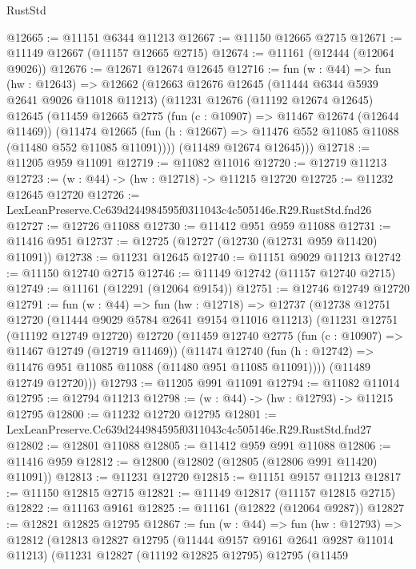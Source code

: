 \begin{lexlean}{RustStd}
\begin{coremodule}
@12665 := @11151 @6344 @11213
@12667 := @11150 @12665 @2715
@12671 := @11149 @12667 (@11157 @12665 @2715)
@12674 := @11161 (@12444 (@12064 @9026))
@12676 := @12671 @12674 @12645
@12716 := fun (w : @44) =>
  fun (hw : @12643) =>
  @12662
    (@12663
      @12676
      @12645
      (@11444 @6344 @5939 @2641 @9026 @11018 @11213)
      (@11231
        @12676
        (@11192 @12674 @12645)
        @12645
        (@11459
          @12665
          @2775
          (fun (c : @10907) => @11467 @12674 (@12644 @11469))
          (@11474
            @12665
            (fun (h : @12667) => @11476 @552 @11085 @11088 (@11480 @552 @11085 @11091))))
        (@11489 @12674 @12645)))
@12718 := @11205 @959 @11091
@12719 := @11082 @11016
@12720 := @12719 @11213
@12723 := (w : @44) -> (hw : @12718) -> @11215 @12720
@12725 := @11232 @12645 @12720
@12726 := LexLeanPreserve.Cc639d244984595f0311043c4c505146e.R29.RustStd.fnd26
@12727 := @12726 @11088
@12730 := @11412 @951 @959 @11088
@12731 := @11416 @951
@12737 := @12725 (@12727 (@12730 (@12731 @959 @11420) @11091))
@12738 := @11231 @12645
@12740 := @11151 @9029 @11213
@12742 := @11150 @12740 @2715
@12746 := @11149 @12742 (@11157 @12740 @2715)
@12749 := @11161 (@12291 (@12064 @9154))
@12751 := @12746 @12749 @12720
@12791 := fun (w : @44) =>
  fun (hw : @12718) =>
  @12737
    (@12738
      @12751
      @12720
      (@11444 @9029 @5784 @2641 @9154 @11016 @11213)
      (@11231
        @12751
        (@11192 @12749 @12720)
        @12720
        (@11459
          @12740
          @2775
          (fun (c : @10907) => @11467 @12749 (@12719 @11469))
          (@11474
            @12740
            (fun (h : @12742) => @11476 @951 @11085 @11088 (@11480 @951 @11085 @11091))))
        (@11489 @12749 @12720)))
@12793 := @11205 @991 @11091
@12794 := @11082 @11014
@12795 := @12794 @11213
@12798 := (w : @44) -> (hw : @12793) -> @11215 @12795
@12800 := @11232 @12720 @12795
@12801 := LexLeanPreserve.Cc639d244984595f0311043c4c505146e.R29.RustStd.fnd27
@12802 := @12801 @11088
@12805 := @11412 @959 @991 @11088
@12806 := @11416 @959
@12812 := @12800 (@12802 (@12805 (@12806 @991 @11420) @11091))
@12813 := @11231 @12720
@12815 := @11151 @9157 @11213
@12817 := @11150 @12815 @2715
@12821 := @11149 @12817 (@11157 @12815 @2715)
@12822 := @11163 @9161
@12825 := @11161 (@12822 (@12064 @9287))
@12827 := @12821 @12825 @12795
@12867 := fun (w : @44) =>
  fun (hw : @12793) =>
  @12812
    (@12813
      @12827
      @12795
      (@11444 @9157 @9161 @2641 @9287 @11014 @11213)
      (@11231
        @12827
        (@11192 @12825 @12795)
        @12795
        (@11459

\end{coremodule}
\end{lexlean}
